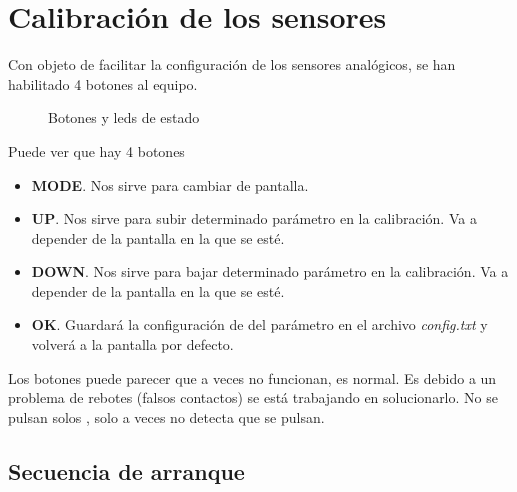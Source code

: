 \chapter{Calibración de los sensores}

Con objeto de facilitar la configuración de los sensores analógicos, se han habilitado 4 botones al equipo.

\begin{figure}[htbp!] 
\caption{Botones y leds de estado}\label{botones} 
\end{figure}

Puede ver que hay 4 botones
\begin{itemize}
\item \textbf{MODE}. Nos sirve para cambiar de pantalla.
\item \textbf{UP}. Nos sirve para subir determinado parámetro en la calibración. Va a depender de la pantalla en la que se esté.
\item \textbf{DOWN}. Nos sirve para bajar determinado parámetro en la calibración. Va a depender de la pantalla en la que se esté.
\item \textbf{OK}. Guardará la configuración de del parámetro en el archivo \emph{config.txt} y volverá a la pantalla por defecto.
\end{itemize}

Los botones puede parecer que a veces no funcionan, es normal. Es debido a un problema de rebotes (falsos contactos) se está trabajando en solucionarlo. No se pulsan solos , solo a veces no detecta que se pulsan.

\section{Secuencia de arranque}

